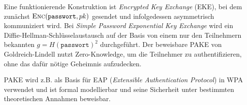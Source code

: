 Eine funktionierende Konstruktion ist \emph{Encrypted Key Exchange}
(EKE), bei dem zunächst $\textsc{Enc}(\mathtt{passwort},pk)$ gesendet und
infolgedessen asymmetrisch kommuniziert wird. Bei \emph{Simple Password
Exponential Key Exchange} wird ein Diffie-Hellman-Schlüsselaustausch auf
der Basis von einem nur den Teilnehmern bekannten $g =
H(\mathtt{passwort})^2$ durchgeführt. Der beweisbare PAKE von
Goldreich-Lindell nutzt Zero-Knowledge, um die Teilnehmer zu
authentifizieren, ohne das dafür nötige Geheimnis aufzudecken.

PAKE wird z.B. als Basis für EAP (\emph{Extensible Authentication
Protocol}) in WPA verwendet und ist formal modellierbar und seine
Sicherheit unter bestimmten theoretischen Annahmen beweisbar.

